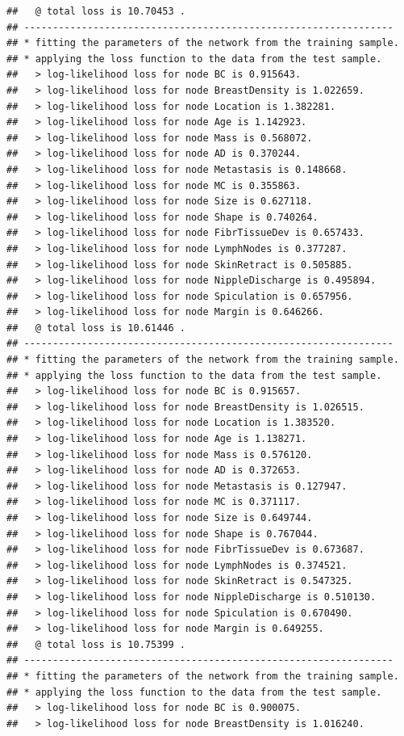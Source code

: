 \documentclass[]{article}
\begin{document}
\begin{verbatim}
##   @ total loss is 10.70453 .
## ----------------------------------------------------------------
## * fitting the parameters of the network from the training sample.
## * applying the loss function to the data from the test sample.
##   > log-likelihood loss for node BC is 0.915643.
##   > log-likelihood loss for node BreastDensity is 1.022659.
##   > log-likelihood loss for node Location is 1.382281.
##   > log-likelihood loss for node Age is 1.142923.
##   > log-likelihood loss for node Mass is 0.568072.
##   > log-likelihood loss for node AD is 0.370244.
##   > log-likelihood loss for node Metastasis is 0.148668.
##   > log-likelihood loss for node MC is 0.355863.
##   > log-likelihood loss for node Size is 0.627118.
##   > log-likelihood loss for node Shape is 0.740264.
##   > log-likelihood loss for node FibrTissueDev is 0.657433.
##   > log-likelihood loss for node LymphNodes is 0.377287.
##   > log-likelihood loss for node SkinRetract is 0.505885.
##   > log-likelihood loss for node NippleDischarge is 0.495894.
##   > log-likelihood loss for node Spiculation is 0.657956.
##   > log-likelihood loss for node Margin is 0.646266.
##   @ total loss is 10.61446 .
## ----------------------------------------------------------------
## * fitting the parameters of the network from the training sample.
## * applying the loss function to the data from the test sample.
##   > log-likelihood loss for node BC is 0.915657.
##   > log-likelihood loss for node BreastDensity is 1.026515.
##   > log-likelihood loss for node Location is 1.383520.
##   > log-likelihood loss for node Age is 1.138271.
##   > log-likelihood loss for node Mass is 0.576120.
##   > log-likelihood loss for node AD is 0.372653.
##   > log-likelihood loss for node Metastasis is 0.127947.
##   > log-likelihood loss for node MC is 0.371117.
##   > log-likelihood loss for node Size is 0.649744.
##   > log-likelihood loss for node Shape is 0.767044.
##   > log-likelihood loss for node FibrTissueDev is 0.673687.
##   > log-likelihood loss for node LymphNodes is 0.374521.
##   > log-likelihood loss for node SkinRetract is 0.547325.
##   > log-likelihood loss for node NippleDischarge is 0.510130.
##   > log-likelihood loss for node Spiculation is 0.670490.
##   > log-likelihood loss for node Margin is 0.649255.
##   @ total loss is 10.75399 .
## ----------------------------------------------------------------
## * fitting the parameters of the network from the training sample.
## * applying the loss function to the data from the test sample.
##   > log-likelihood loss for node BC is 0.900075.
##   > log-likelihood loss for node BreastDensity is 1.016240.

\end{verbatim}
\end{document}
